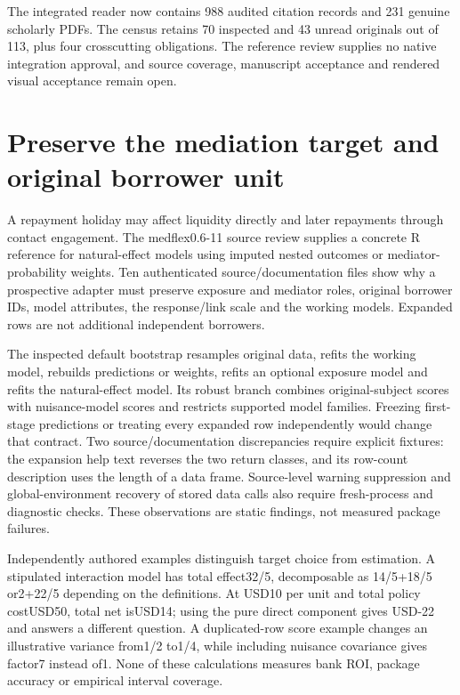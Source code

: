 The integrated reader now contains 988 audited citation records and 231
genuine scholarly PDFs. The census retains 70 inspected and 43 unread
originals out of 113, plus four crosscutting obligations. The reference
review supplies no native integration approval, and source coverage,
manuscript acceptance and rendered visual acceptance remain open.
\citep{sp23gist_reader,sp23gist_progress}

\hypertarget{preserve-the-mediation-target-and-original-borrower-unit}{%
\section{Preserve the mediation target and original borrower
unit}\label{preserve-the-mediation-target-and-original-borrower-unit}}

A repayment holiday may affect liquidity directly and later repayments
through contact engagement. The medflex0.6-11 source review supplies a
concrete R reference for natural-effect models using imputed nested
outcomes or mediator-probability weights. Ten authenticated
source/documentation files show why a prospective adapter must preserve
exposure and mediator roles, original borrower IDs, model attributes,
the response/link scale and the working models. Expanded rows are not
additional independent borrowers. \citep{exec23_medflex_sources}

The inspected default bootstrap resamples original data, refits the
working model, rebuilds predictions or weights, refits an optional
exposure model and refits the natural-effect model. Its robust branch
combines original-subject scores with nuisance-model scores and
restricts supported model families. Freezing first-stage predictions or
treating every expanded row independently would change that contract.
Two source/documentation discrepancies require explicit fixtures: the
expansion help text reverses the two return classes, and its row-count
description uses the length of a data frame. Source-level warning
suppression and global-environment recovery of stored data calls also
require fresh-process and diagnostic checks. These observations are
static findings, not measured package failures.
\citep{exec23_medflex_sources}

Independently authored examples distinguish target choice from
estimation. A stipulated interaction model has total effect32/5,
decomposable as 14/5+18/5 or2+22/5 depending on the definitions. At
USD10 per unit and total policy costUSD50, total net isUSD14; using the
pure direct component gives USD-22 and answers a different question. A
duplicated-row score example changes an illustrative variance from1/2
to1/4, while including nuisance covariance gives factor7 instead of1.
None of these calculations measures bank ROI, package accuracy or
empirical interval coverage. \citep{exec23_medflex_reference}

